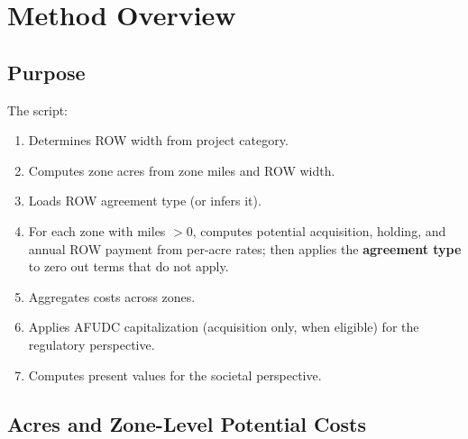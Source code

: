 \documentclass[ctcc_full_documentation.tex]{subfiles}
\begin{document}
\begin{center}
\end{center}

\section{Method Overview}

\subsection{Purpose}

The script:
\begin{enumerate}
    \item Determines ROW width from project category.
    \item Computes zone acres from zone miles and ROW width.
    \item Loads ROW agreement type (or infers it).
    \item For each zone with miles $> 0$, computes potential acquisition, holding, and annual ROW payment from per-acre rates; then applies the \textbf{agreement type} to zero out terms that do not apply.
    \item Aggregates costs across zones.
    \item Applies AFUDC capitalization (acquisition only, when eligible) for the regulatory perspective.
    \item Computes present values for the societal perspective.
\end{enumerate}

\subsection{Acres and Zone-Level Potential Costs}
\end{document}
